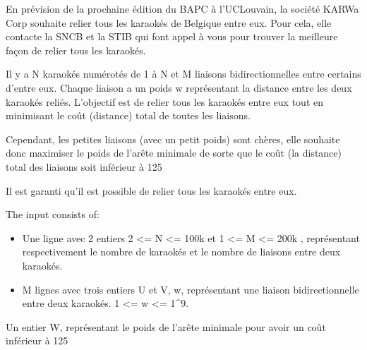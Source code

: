 \problemname{\problemyamlname}


En prévision de la prochaine édition du BAPC à l'UCLouvain, la société KARWa Corp souhaite relier tous les karaokés de Belgique entre eux. Pour cela, elle contacte la SNCB et la STIB qui font appel à vous pour trouver la meilleure façon de relier tous les karaokés.

Il y a N karaokés numérotés de 1 à N et M liaisons bidirectionnelles entre certains d'entre eux. Chaque liaison a un poids w représentant la distance entre les deux karaokés reliés. L'objectif est de relier tous les karaokés entre eux tout en minimisant le coût (distance) total de toutes les liaisons.

Cependant, les petites liaisons (avec un petit poids) sont chères, elle souhaite donc maximiser le poids de l'arête minimale de sorte que le coût (la distance) total des liaisons soit inférieur à 125%

Il est garanti qu'il est possible de relier tous les karaokés entre eux.


\begin{Input}
    The input consists of:
    \begin{itemize}
        \item Une ligne avec 2 entiers 2 <= N <= 100k et 1 <= M <= 200k , représentant respectivement le nombre de karaokés et le nombre de liaisons entre deux karaokés.
        \item M lignes avec trois entiers U et V, w, représentant une liaison bidirectionnelle entre deux karaokés. 1 <= w <= 1^9.
    \end{itemize}
\end{Input}

\begin{Output}
    Un entier W, représentant le poids de l'arête minimale pour avoir un coût inférieur à 125%
\end{Output}

